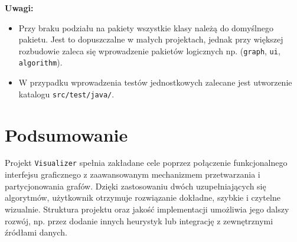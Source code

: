 \documentclass[a4paper,12pt]{article}
\begin{document}
\textbf{Uwagi:}
\begin{itemize}
    \item Przy braku podziału na pakiety wszystkie klasy należą do domyślnego pakietu. Jest to dopuszczalne w małych projektach, jednak przy większej rozbudowie zaleca się wprowadzenie pakietów logicznych np. (\texttt{graph}, \texttt{ui}, \texttt{algorithm}).
    \item W przypadku wprowadzenia testów jednostkowych zalecane jest utworzenie katalogu \texttt{src/test/java/}.
\end{itemize}
\section{Podsumowanie}
Projekt \texttt{Visualizer} spełnia zakładane cele poprzez połączenie funkcjonalnego interfejsu graficznego z zaawansowanym mechanizmem przetwarzania i partycjonowania grafów. Dzięki zastosowaniu dwóch uzupełniających się algorytmów, użytkownik otrzymuje rozwiązanie dokładne, szybkie i czytelne wizualnie. Struktura projektu oraz jakość implementacji umożliwia jego dalszy rozwój, np. przez dodanie innych heurystyk lub integrację z zewnętrznymi źródłami danych.
\end{document}
